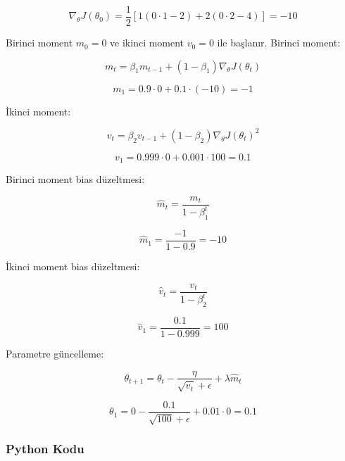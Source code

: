\[ \nabla_\theta J(\theta_0) = \frac{1}{2} [1(0 \cdot 1 - 2) + 2(0 \cdot 2 - 4)] = -10 \]

Birinci moment $m_0 = 0$ ve ikinci moment $v_0 = 0$ ile başlanır. Birinci moment:

\[ m_t = \beta_1 m_{t-1} + (1 - \beta_1) \nabla_\theta J(\theta_t) \]

\[ m_1 = 0.9 \cdot 0 + 0.1 \cdot (-10) = -1 \]

İkinci moment:

\[ v_t = \beta_2 v_{t-1} + (1 - \beta_2) \nabla_\theta J(\theta_t)^2 \]

\[ v_1 = 0.999 \cdot 0 + 0.001 \cdot 100 = 0.1 \]

Birinci moment bias düzeltmesi:

\[ \hat{m}_t = \frac{m_t}{1 - \beta_{1}^t} \]

\[ \hat{m}_1 = \frac{-1}{1 - 0.9} = -10 \]

İkinci moment bias düzeltmesi:

\[ \hat{v}_t = \frac{v_t}{1 - \beta_{2}^t} \]

\[ \hat{v}_1 = \frac{0.1}{1 - 0.999} = 100 \]

Parametre güncelleme:

\[ \theta_{t+1} = \theta_t - \frac{\eta}{\sqrt{\hat{v}_t} + \epsilon} + \lambda \hat{m}_t \]

\[ \theta_{1} = 0 - \frac{0.1}{\sqrt{100} + \epsilon} + 0.01 \cdot 0 = 0.1 \]

\subsubsection{Python Kodu}

